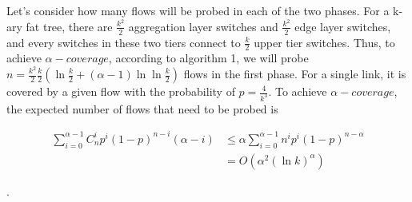 Let's consider how many flows will be probed in each of the two phases. 
For a k-ary fat tree, there are $\frac{k^2}{2}$ aggregation layer switches 
and $\frac{k^2}{2}$ edge layer switches, and every switches in these two tiers 
connect to $\frac{k}{2}$ upper tier switches. Thus, to achieve $\alpha-coverage$, 
according to algorithm 1, we will probe 
$n = \frac{k^2}{2}\frac{k}{2}(\ln\frac{k}{2}+(\alpha - 1)\ln\ln\frac{k}{2})$ 
flows in the first phase. For a single link, it is covered by a 
given flow with the probability of $p = \frac{4}{k^3}$. To achieve 
$\alpha-coverage$, the expected number of flows that need to 
be probed is 

\[
\begin{aligned}
    \sum\limits_{i = 0}^{\alpha - 1}C_n^ip^i(1-p)^{n-i}(\alpha - i) &\leq \alpha\sum\limits_{i = 0}^{\alpha - 1}n^ip^i(1-p)^{n-\alpha}\\
    &= O(\alpha^2(\ln k)^\alpha)
\end{aligned}
\]

.